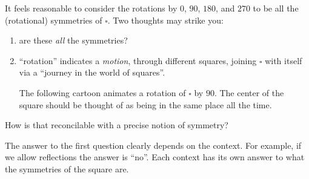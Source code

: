 It feels reasonable to consider the rotations by $0$\textdegree, $90$\textdegree, $180$\textdegree, and $270$\textdegree{} to be all the (rotational) symmetries of $\square$.  Two thoughts may strike you:
\begin{enumerate}
\item
  are these \emph{all} the symmetries?
\item ``rotation'' indicates a \emph{motion}, through different squares,
joining $\square$ with itself via a ``journey in the world of squares''.

The following cartoon animates a rotation of $\square$ by $90$\textdegree.
The center of the square should be thought of as being in the same place
all the time.
\end{enumerate}
\begin{center}
\end{center}
How is that reconcilable with a precise notion of symmetry?

The answer to the first question clearly depends on the context. 
For example, if we allow reflections the answer is ``no''.
Each context has its own answer to what the symmetries of the square are.

